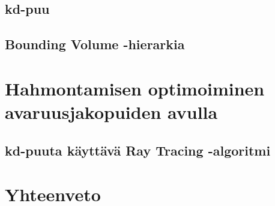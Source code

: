 ﻿\documentclass[a4paper,12pt, titlepage]{article}
\begin{document}
\subsection{kd-puu}
\subsection{Bounding Volume -hierarkia}

\newpage
\section{Hahmontamisen optimoiminen avaruusjakopuiden avulla}
\subsection{kd-puuta käyttävä Ray Tracing -algoritmi}
\citep{havran}

\section{Yhteenveto}

\clearpage

\listofalgorithms
\end{document}
